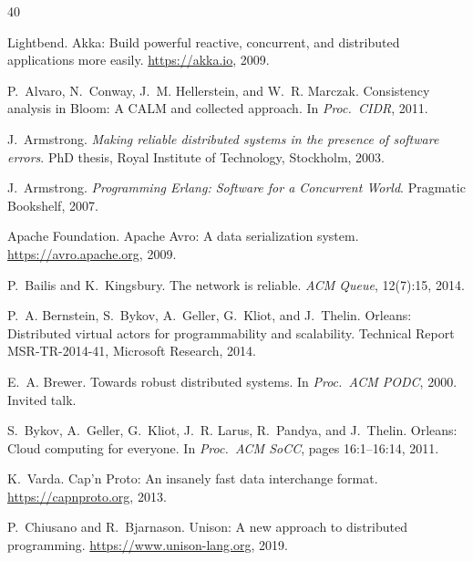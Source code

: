 \documentclass[11pt,a4paper]{article}
\begin{document}
\begin{thebibliography}{40}

Lightbend.
\newblock Akka: Build powerful reactive, concurrent, and distributed
  applications more easily.
\newblock \url{https://akka.io}, 2009.

P.~Alvaro, N.~Conway, J.~M. Hellerstein, and W.~R. Marczak.
\newblock Consistency analysis in {Bloom}: A {CALM} and collected approach.
\newblock In \emph{Proc.\ CIDR}, 2011.

J.~Armstrong.
\newblock \emph{Making reliable distributed systems in the presence of
  software errors}.
\newblock PhD thesis, Royal Institute of Technology, Stockholm, 2003.

J.~Armstrong.
\newblock \emph{Programming Erlang: Software for a Concurrent World}.
\newblock Pragmatic Bookshelf, 2007.

Apache Foundation.
\newblock Apache {Avro}: A data serialization system.
\newblock \url{https://avro.apache.org}, 2009.

P.~Bailis and K.~Kingsbury.
\newblock The network is reliable.
\newblock \emph{ACM Queue}, 12(7):15, 2014.

P.~A. Bernstein, S.~Bykov, A.~Geller, G.~Kliot, and J.~Thelin.
\newblock Orleans: Distributed virtual actors for programmability and
  scalability.
\newblock Technical Report MSR-TR-2014-41, Microsoft Research, 2014.

E.~A. Brewer.
\newblock Towards robust distributed systems.
\newblock In \emph{Proc.\ ACM PODC}, 2000.
\newblock Invited talk.

S.~Bykov, A.~Geller, G.~Kliot, J.~R. Larus, R.~Pandya, and J.~Thelin.
\newblock Orleans: Cloud computing for everyone.
\newblock In \emph{Proc.\ ACM SoCC}, pages 16:1--16:14, 2011.

K.~Varda.
\newblock Cap'n {Proto}: An insanely fast data interchange format.
\newblock \url{https://capnproto.org}, 2013.

P.~Chiusano and R.~Bjarnason.
\newblock Unison: A new approach to distributed programming.
\newblock \url{https://www.unison-lang.org}, 2019.


\end{thebibliography}
\end{document}
